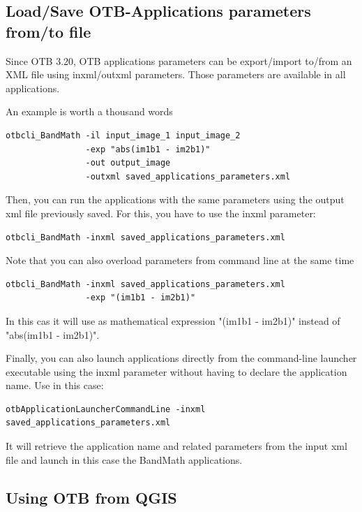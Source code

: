 \subsection{Load/Save OTB-Applications parameters from/to file}

Since OTB 3.20, OTB applications parameters can be export/import to/from an XML
file using inxml/outxml parameters. Those parameters are available in all
applications.

An example is worth a thousand words

\begin{verbatim}
otbcli_BandMath -il input_image_1 input_image_2
                -exp "abs(im1b1 - im2b1)"
                -out output_image
                -outxml saved_applications_parameters.xml
\end{verbatim}

Then, you can run the applications with the same parameters using the output xml
file previously saved. For this, you have to use the inxml parameter:

\begin{verbatim}
otbcli_BandMath -inxml saved_applications_parameters.xml
\end{verbatim}

Note that you can also overload parameters from command line at the same time

\begin{verbatim}
otbcli_BandMath -inxml saved_applications_parameters.xml 
                -exp "(im1b1 - im2b1)"
\end{verbatim}

In this cas it will use as mathematical expression "(im1b1 - im2b1)" instead
of "abs(im1b1 - im2b1)".

Finally, you can also launch applications directly from the command-line launcher executable using
the inxml parameter without having to declare the application name. Use in this case:

\begin{verbatim}
otbApplicationLauncherCommandLine -inxml saved_applications_parameters.xml
\end{verbatim}
 
It will retrieve the application name and related parameters from the input xml
file and launch in this case the BandMath applications.

\subsection{Using OTB from QGIS}
